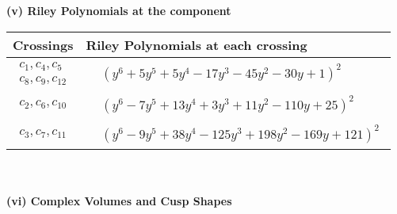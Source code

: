 \documentclass[1p]{elsarticle_modified}
\theoremstyle{definition}
\begin{document}
\newpage\renewcommand{\arraystretch}{1}
\flushleft \textbf{(v) Riley Polynomials at the component}\newline \\
\begin{tabular}{m{50pt}|m{274pt}}
Crossings & \hspace{64pt}Riley Polynomials at each crossing \\
\hline $$\begin{aligned}c_{1},c_{4},c_{5}\\c_{8},c_{9},c_{12}\end{aligned}$$&$\begin{aligned}
&(y^6+5 y^5+5 y^4-17 y^3-45 y^2-30 y+1)^2
\end{aligned}$\\
\hline $$\begin{aligned}c_{2},c_{6},c_{10}\end{aligned}$$&$\begin{aligned}
&(y^6-7 y^5+13 y^4+3 y^3+11 y^2-110 y+25)^2
\end{aligned}$\\
\hline $$\begin{aligned}c_{3},c_{7},c_{11}\end{aligned}$$&$\begin{aligned}
&(y^6-9 y^5+38 y^4-125 y^3+198 y^2-169 y+121)^2
\end{aligned}$\\
\hline
\end{tabular}\\~\\
\newpage\flushleft \textbf{(vi) Complex Volumes and Cusp Shapes}
\end{document}
